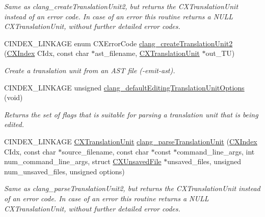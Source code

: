 \begin{DoxyCompactItemize}
\begin{DoxyCompactList}\small\item\em Same as {\ttfamily clang\+\_\+create\+Translation\+Unit2}, but returns the {\ttfamily C\+X\+Translation\+Unit} instead of an error code. In case of an error this routine returns a {\ttfamily N\+U\+LL} {\ttfamily C\+X\+Translation\+Unit}, without further detailed error codes. \end{DoxyCompactList}\item 
C\+I\+N\+D\+E\+X\+\_\+\+L\+I\+N\+K\+A\+GE enum C\+X\+Error\+Code \mbox{\hyperlink{group__CINDEX__TRANSLATION__UNIT_ga749a8220b23a06ba2fdcbea06d6bb211}{clang\+\_\+create\+Translation\+Unit2}} (\mbox{\hyperlink{group__CINDEX_gae039c2574bfd75774ca7a9a3e55910cb}{C\+X\+Index}} C\+Idx, const char $\ast$ast\+\_\+filename, \mbox{\hyperlink{group__CINDEX_gacdb7815736ca709ce9a5e1ec2b7e16ac}{C\+X\+Translation\+Unit}} $\ast$out\+\_\+\+TU)
\begin{DoxyCompactList}\small\item\em Create a translation unit from an A\+ST file ({\ttfamily -\/emit-\/ast}). \end{DoxyCompactList}\item 
C\+I\+N\+D\+E\+X\+\_\+\+L\+I\+N\+K\+A\+GE unsigned \mbox{\hyperlink{group__CINDEX__TRANSLATION__UNIT_ga35cfcf8b5c2c15247e476c4e47c2d37d}{clang\+\_\+default\+Editing\+Translation\+Unit\+Options}} (void)
\begin{DoxyCompactList}\small\item\em Returns the set of flags that is suitable for parsing a translation unit that is being edited. \end{DoxyCompactList}\item 
\mbox{\label{group__CINDEX__TRANSLATION__UNIT_ga2baf83f8c3299788234c8bce55e4472e}} 
C\+I\+N\+D\+E\+X\+\_\+\+L\+I\+N\+K\+A\+GE \mbox{\hyperlink{group__CINDEX_gacdb7815736ca709ce9a5e1ec2b7e16ac}{C\+X\+Translation\+Unit}} \mbox{\hyperlink{group__CINDEX__TRANSLATION__UNIT_ga2baf83f8c3299788234c8bce55e4472e}{clang\+\_\+parse\+Translation\+Unit}} (\mbox{\hyperlink{group__CINDEX_gae039c2574bfd75774ca7a9a3e55910cb}{C\+X\+Index}} C\+Idx, const char $\ast$source\+\_\+filename, const char $\ast$const $\ast$command\+\_\+line\+\_\+args, int num\+\_\+command\+\_\+line\+\_\+args, struct \mbox{\hyperlink{structCXUnsavedFile}{C\+X\+Unsaved\+File}} $\ast$unsaved\+\_\+files, unsigned num\+\_\+unsaved\+\_\+files, unsigned options)
\begin{DoxyCompactList}\small\item\em Same as {\ttfamily clang\+\_\+parse\+Translation\+Unit2}, but returns the {\ttfamily C\+X\+Translation\+Unit} instead of an error code. In case of an error this routine returns a {\ttfamily N\+U\+LL} {\ttfamily C\+X\+Translation\+Unit}, without further detailed error codes. \end{DoxyCompactList}\item 

\end{DoxyCompactItemize}
